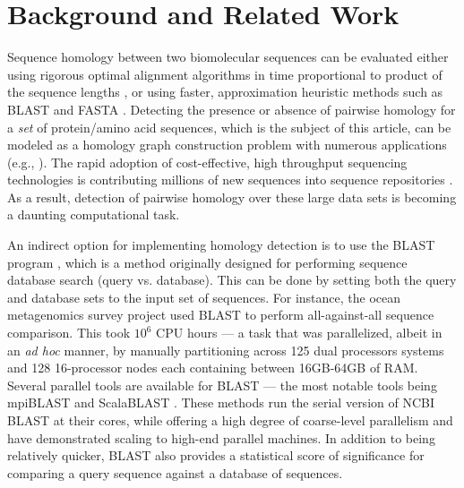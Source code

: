 \documentclass[10pt,journal,letterpaper,compsoc]{IEEEtran}
\begin{document}


\section{Background and Related Work}
\label{secRelatedWork}

Sequence homology between two biomolecular sequences can be evaluated either using rigorous optimal alignment algorithms in time proportional to product of the sequence lengths \cite{Needleman70,Smith81}, or using faster, approximation heuristic methods such as BLAST \cite{Altschul90} and FASTA \cite{Pearson88}. Detecting the presence or absence of pairwise homology for a \emph{set} of protein/amino acid sequences, which is the subject of this article, can be modeled as a homology graph construction problem with numerous applications (e.g., \cite{Apweiler04,Bateman04,Enright02,Kriventseva01,Olman07}). The rapid adoption of cost-effective, high throughput sequencing technologies is contributing  millions of new sequences  into sequence repositories \cite{CAMERA,IMG08,NCBI}. As a result, detection of pairwise homology over these large data sets is becoming a daunting computational task. 

An indirect option for implementing homology detection is to use the BLAST program \cite{Altschul90}, which is a method originally designed for performing sequence database search (query vs. database). This can be done by setting both the query and database sets to the input set of sequences. For instance, the ocean metagenomics survey project \cite{Yooseph07} used BLAST to perform all-against-all sequence comparison. This took $10^6$ CPU hours --- a task that was parallelized, albeit in an {\it ad hoc} manner, by manually partitioning across 125 dual processors systems and 128 16-processor nodes each containing between 16GB-64GB of RAM. Several parallel tools are available for BLAST --- the most notable tools being mpiBLAST \cite{Darling03} and ScalaBLAST \cite{Oehmen06}. These methods run the serial version of NCBI BLAST at their cores, while offering a high degree of coarse-level parallelism and have demonstrated scaling  to high-end parallel machines. In addition to being relatively quicker, BLAST also provides a statistical score of significance for comparing a query sequence against a database of sequences. 
\end{document}
